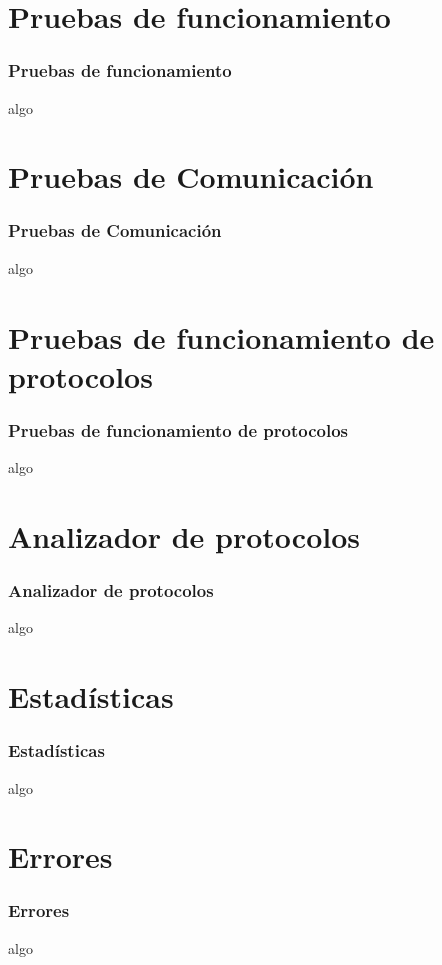 \section{Pruebas de funcionamiento}
  \begin{frame}
    \frametitle{Pruebas de funcionamiento}
    algo
  \end{frame}
\section{Pruebas de Comunicaci\'on}
  \begin{frame}
    \frametitle{Pruebas de Comunicaci\'on}
    algo
  \end{frame}
\section{Pruebas de funcionamiento de protocolos}
  \begin{frame}
    \frametitle{Pruebas de funcionamiento de protocolos}
    algo
  \end{frame}
\section{Analizador de protocolos}
  \begin{frame}
    \frametitle{Analizador de protocolos}
    algo
  \end{frame}
\section{Estad\'isticas}
  \begin{frame}
    \frametitle{Estad\'isticas}
    algo
  \end{frame}
\section{Errores}
  \begin{frame}
    \frametitle{Errores}
    algo
  \end{frame}
